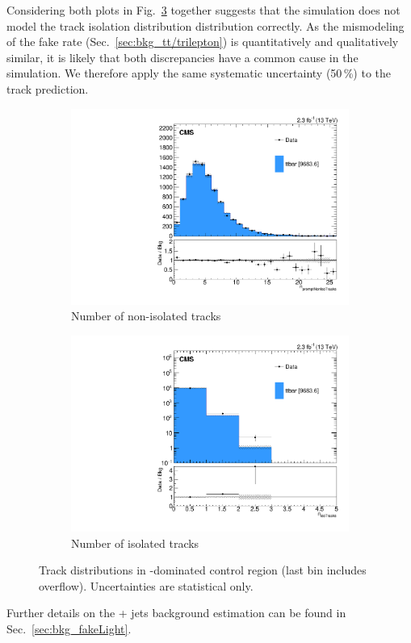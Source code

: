 Considering both plots in Fig.~\ref{fig:tt/track} together suggests that the \ttbar simulation does not model the track isolation distribution distribution correctly. As the mismodeling of the \ttbar fake rate (Sec.~\ref{sec:bkg_tt/trilepton}) is quantitatively and qualitatively similar, it is likely that both discrepancies have a common cause in the simulation. We therefore apply the same systematic uncertainty (50\,\%) to the track prediction.

\begin{figure}
\begin{center}
	\begin{subfigure}[b]{.7\textwidth}
		\includegraphics[width=\textwidth]{Background/bkg_tt/ttbar_NPROMPTNONISOINCLUSIVETRACKS7_STgt300}
		\caption{Number of non-isolated tracks} \label{fig:tt/trackNonIso}
	\end{subfigure}
	\begin{subfigure}[b]{.7\textwidth}
		\includegraphics[width=\textwidth]{Background/bkg_tt/ttbar_NGOODTRACKS_STgt300}
		\caption{Number of isolated tracks} \label{fig:tt/trackIso}
	\end{subfigure}
	\caption{Track distributions in \ttbar-dominated control region (last bin includes overflow). Uncertainties are statistical only.
	\label{fig:tt/track}}
\end{center}
\end{figure}

Further details on the \Z + jets background estimation can be found in Sec.~\ref{sec:bkg_fakeLight}.
